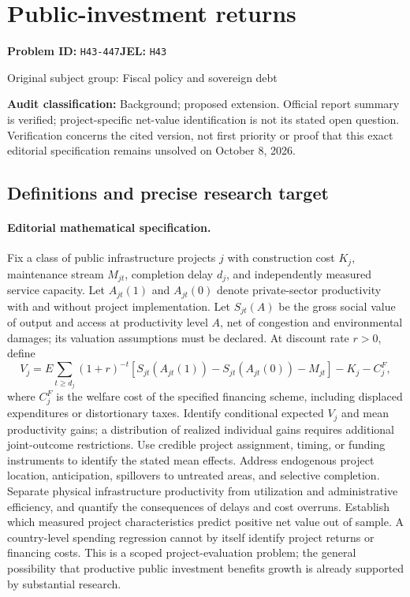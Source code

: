 \documentclass[11pt,a4paper]{article}
\begin{document}
\section*{Public-investment returns}
\textbf{Problem ID:} \texttt{H43-447}\quad \textbf{JEL:} \texttt{H43}\par
\label{problem:OP-0252}
\label{audited:ECON-097}
{\sffamily\small\color{muted}Original subject group: Fiscal policy and sovereign debt\par}
\label{definitions:problem:30007533}
\textbf{Audit classification:} Background; proposed extension. Official report summary is verified; project-specific net-value identification is not its stated open question. Verification concerns the cited version, not first priority or proof that this exact editorial specification remains unsolved on October 8, 2026.
\subsection*{Definitions and precise research target}
\paragraph{Editorial mathematical specification.} Fix a class of public infrastructure projects \(j\) with construction cost \(K_j\), maintenance stream \(M_{jt}\), completion delay \(d_j\), and independently measured service capacity. Let \(A_{jt}(1)\) and \(A_{jt}(0)\) denote private-sector productivity with and without project implementation. Let \(S_{jt}(A)\) be the gross social value of output and access at productivity level \(A\), net of congestion and environmental damages; its valuation assumptions must be declared. At discount rate \(r>0\), define
\[
V_j=E\sum_{t\ge d_j}(1+r)^{-t}
[S_{jt}(A_{jt}(1))-S_{jt}(A_{jt}(0))-M_{jt}]
-K_j-C_j^F,
\]
where \(C_j^F\) is the welfare cost of the specified financing scheme, including displaced expenditures or distortionary taxes.
Identify conditional expected \(V_j\) and mean productivity gains; a distribution of realized individual gains requires additional joint-outcome restrictions. Use credible project assignment, timing, or funding instruments to identify the stated mean effects. Address endogenous project location, anticipation, spillovers to untreated areas, and selective completion. Separate physical infrastructure productivity from utilization and administrative efficiency, and quantify the consequences of delays and cost overruns. Establish which measured project characteristics predict positive net value out of sample. A country-level spending regression cannot by itself identify project returns or financing costs. This is a scoped project-evaluation problem; the general possibility that productive public investment benefits growth is already supported by substantial research.
\end{document}
